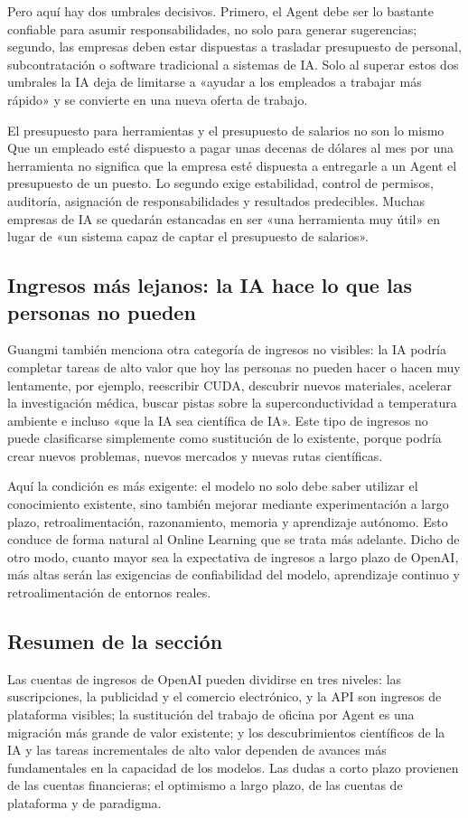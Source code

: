Pero aquí hay dos umbrales decisivos. Primero, el Agent debe ser lo bastante confiable para asumir responsabilidades, no solo para generar sugerencias; segundo, las empresas deben estar dispuestas a trasladar presupuesto de personal, subcontratación o software tradicional a sistemas de IA. Solo al superar estos dos umbrales la IA deja de limitarse a «ayudar a los empleados a trabajar más rápido» y se convierte en una nueva oferta de trabajo.

\begin{warningbox}{El presupuesto para herramientas y el presupuesto de salarios no son lo mismo}
Que un empleado esté dispuesto a pagar unas decenas de dólares al mes por una herramienta no significa que la empresa esté dispuesta a entregarle a un Agent el presupuesto de un puesto. Lo segundo exige estabilidad, control de permisos, auditoría, asignación de responsabilidades y resultados predecibles. Muchas empresas de IA se quedarán estancadas en ser «una herramienta muy útil» en lugar de «un sistema capaz de captar el presupuesto de salarios».
\end{warningbox}

\subsection{Ingresos más lejanos: la IA hace lo que las personas no pueden}

Guangmi también menciona otra categoría de ingresos no visibles: la IA podría completar tareas de alto valor que hoy las personas no pueden hacer o hacen muy lentamente, por ejemplo, reescribir CUDA, descubrir nuevos materiales, acelerar la investigación médica, buscar pistas sobre la superconductividad a temperatura ambiente e incluso «que la IA sea científica de IA». Este tipo de ingresos no puede clasificarse simplemente como sustitución de lo existente, porque podría crear nuevos problemas, nuevos mercados y nuevas rutas científicas.

Aquí la condición es más exigente: el modelo no solo debe saber utilizar el conocimiento existente, sino también mejorar mediante experimentación a largo plazo, retroalimentación, razonamiento, memoria y aprendizaje autónomo. Esto conduce de forma natural al Online Learning que se trata más adelante. Dicho de otro modo, cuanto mayor sea la expectativa de ingresos a largo plazo de OpenAI, más altas serán las exigencias de confiabilidad del modelo, aprendizaje continuo y retroalimentación de entornos reales.

\subsection{Resumen de la sección}

Las cuentas de ingresos de OpenAI pueden dividirse en tres niveles: las suscripciones, la publicidad y el comercio electrónico, y la API son ingresos de plataforma visibles; la sustitución del trabajo de oficina por Agent es una migración más grande de valor existente; y los descubrimientos científicos de la IA y las tareas incrementales de alto valor dependen de avances más fundamentales en la capacidad de los modelos. Las dudas a corto plazo provienen de las cuentas financieras; el optimismo a largo plazo, de las cuentas de plataforma y de paradigma.
